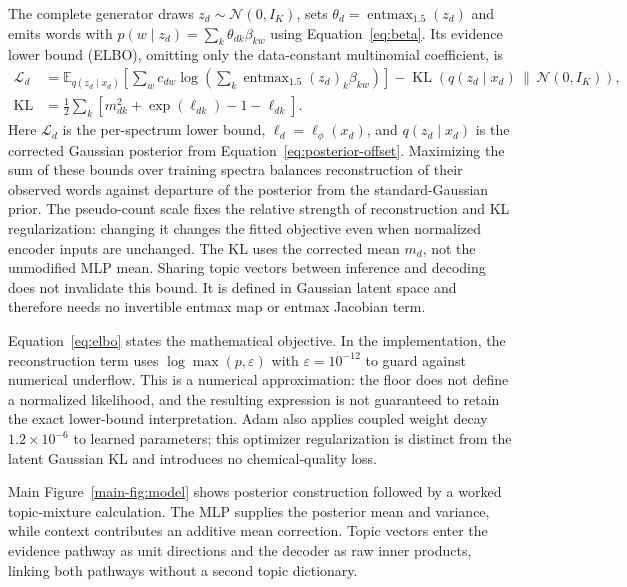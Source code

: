 \documentclass[10pt,a4paper]{article}
\newcommand{\entmax}{\operatorname{entmax}_{1.5}}
\newcommand{\KL}{\operatorname{KL}}
\begin{document}
The complete generator draws $z_d\sim\mathcal N(0,I_K)$, sets
$\theta_d=\entmax(z_d)$ and emits words with
$p(w\mid z_d)=\sum_k\theta_{dk}\beta_{kw}$ using
Equation~\ref{eq:beta}. Its evidence lower bound (ELBO), omitting only the
data-constant multinomial coefficient, is
\begin{align}
 \mathcal L_d &=
 \mathbb E_{q(z_d\mid x_d)}
 \left[\sum_w c_{dw}\log\left(\sum_k\entmax(z_d)_k\beta_{kw}\right)\right]
 -\KL(q(z_d\mid x_d)\,\|\,\mathcal N(0,I_K)), \label{eq:elbo}\\
 \KL &=\frac12\sum_k
       \left[m_{dk}^2+\exp(\ell_{dk})-1-\ell_{dk}\right].
 \label{eq:kl}
\end{align}
Here $\mathcal L_d$ is the per-spectrum lower bound, $\ell_d=\ell_\phi(x_d)$,
and $q(z_d\mid x_d)$ is the corrected Gaussian posterior from
Equation~\ref{eq:posterior-offset}. Maximizing the sum of these bounds over
training spectra balances reconstruction of their observed words against
departure of the posterior from the standard-Gaussian prior.
The pseudo-count scale fixes the relative strength of reconstruction and
KL regularization: changing it changes the fitted objective even when
normalized encoder inputs are unchanged.
The KL uses the corrected mean $m_d$, not the unmodified MLP mean.
Sharing topic vectors between inference and decoding does not invalidate
this bound. It is defined in Gaussian latent space and therefore needs no
invertible entmax map or entmax Jacobian term.

Equation~\ref{eq:elbo} states the mathematical objective. In the implementation,
the reconstruction term uses $\log\max(p,\varepsilon)$ with
$\varepsilon=10^{-12}$ to guard against numerical underflow. This is a
numerical approximation: the floor does not define a normalized likelihood,
and the resulting expression is not guaranteed to retain the exact lower-bound
interpretation.
Adam also applies coupled weight decay $1.2\times10^{-6}$ to learned
parameters; this optimizer regularization is distinct from the latent
Gaussian KL and introduces no chemical-quality loss.

Main Figure~\ref{main-fig:model} shows posterior construction followed by a worked
topic-mixture calculation. The MLP supplies the posterior mean and variance,
while context contributes an additive mean correction. Topic vectors enter
the evidence pathway as unit directions and the decoder as raw inner
products, linking both pathways without a second topic dictionary.
\end{document}
